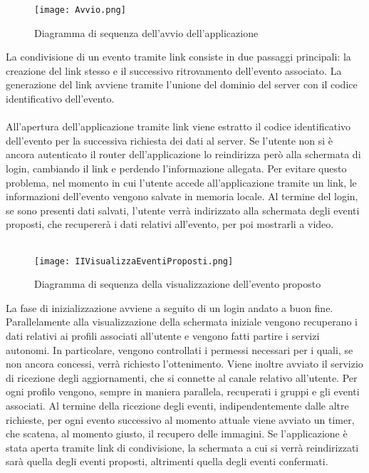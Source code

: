 \begin{figure}[h!]
    \begin{center}
        \texttt{[image: Avvio.png]}
        \caption{Diagramma di sequenza dell'avvio dell'applicazione}
    \end{center}
\end{figure}

La condivisione di un evento tramite link
consiste in due passaggi principali:
la creazione del link stesso e il successivo ritrovamento dell'evento associato.
La generazione del link avviene tramite
l'unione del dominio del server con il codice identificativo dell'evento.\\
\\
All'apertura dell'applicazione tramite link
viene estratto il codice identificativo dell'evento
per la successiva richiesta dei dati al server.
Se l'utente non si è ancora autenticato
il router dell'applicazione lo reindirizza però alla schermata di login,
cambiando il link e perdendo l'informazione allegata.
Per evitare questo problema,
nel momento in cui l'utente accede all'applicazione tramite un link,
le informazioni dell'evento vengono salvate in memoria locale.
Al termine del login, se sono presenti dati salvati,
l'utente verrà indirizzato alla schermata degli eventi proposti,
che recupererà i dati relativi all'evento, per poi mostrarli a video.\\
\\

\begin{figure}[h!]
    \begin{center}
        \texttt{[image: IIVisualizzaEventiProposti.png]}
        \caption{Diagramma di sequenza della visualizzazione dell'evento proposto}
    \end{center}
\end{figure}

\clearpage

La fase di inizializzazione avviene a seguito di un login andato a buon fine.
Parallelamente alla visualizzazione della schermata iniziale
vengono recuperano i dati relativi ai profili associati all'utente
e vengono fatti partire i servizi autonomi.
In particolare,
vengono controllati i permessi necessari per i quali,
se non ancora concessi, verrà richiesto l'ottenimento.
Viene inoltre avviato il servizio di ricezione degli aggiornamenti,
che si connette al canale relativo all'utente.
Per ogni profilo vengono, sempre in maniera parallela,
recuperati i gruppi e gli eventi associati.
Al termine della ricezione degli eventi,
indipendentemente dalle altre richieste,
per ogni evento successivo al momento attuale viene avviato un timer,
che scatena, al momento giusto, il recupero delle immagini.
Se l'applicazione è stata aperta tramite link di condivisione,
la schermata a cui si verrà reindirizzati sarà quella degli eventi proposti,
altrimenti quella degli eventi confermati.\\
\\

